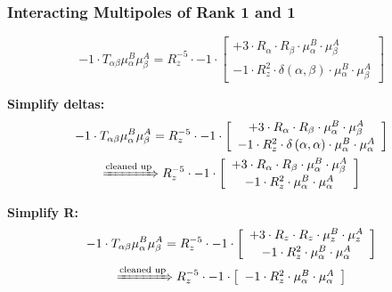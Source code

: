 \documentclass{article}
\begin{document}
\subsubsection*{Interacting Multipoles of Rank 1 and 1}
\begin{equation}
- 1 \cdot T_{\alpha{}\beta{}} \mu{}^{B}_{\alpha{}} \mu{}^{A}_{\beta{}} = R_{z}^{-5} \cdot -1 \cdot  \left[ \begin{array}{c} 
 		+ 3 \cdot R_{\alpha{}} \cdot R_{\beta{}} \cdot \mu{}^{B}_{\alpha{}} \cdot \mu{}^{A}_{\beta{}} 
 \\[0.2em] 		 - 1 \cdot R_{z}^{2} \cdot \delta{}\left(\alpha{}, \beta{}\right) \cdot \mu{}^{B}_{\alpha{}} \cdot \mu{}^{A}_{\beta{}}
 \end{array}\right] 
\end{equation}


\textbf{Simplify deltas:}
\begin{subequations}\begin{gather}
- 1 \cdot T_{\alpha{}\beta{}} \mu{}^{B}_{\alpha{}} \mu{}^{A}_{\beta{}} = R_{z}^{-5} \cdot -1 \cdot  \left[ \begin{array}{c} 
 		+ 3 \cdot R_{\alpha{}} \cdot R_{\beta{}} \cdot \mu{}^{B}_{\alpha{}} \cdot \mu{}^{A}_{\beta{}} 
 \\[0.2em] 		 - 1 \cdot R_{z}^{2} \cdot \delta{}\left(\alpha{}, \alpha{}\right) \cdot \mu{}^{B}_{\alpha{}} \cdot \mu{}^{A}_{\alpha{}}
 \end{array}\right] 
\\ \xRightarrow{\text{cleaned up}}
 R_{z}^{-5} \cdot -1 \cdot  \left[ \begin{array}{c} 
 		+ 3 \cdot R_{\alpha{}} \cdot R_{\beta{}} \cdot \mu{}^{B}_{\alpha{}} \cdot \mu{}^{A}_{\beta{}} 
 \\[0.2em] 		 - 1 \cdot R_{z}^{2} \cdot \mu{}^{B}_{\alpha{}} \cdot \mu{}^{A}_{\alpha{}}
 \end{array}\right] 
\end{gather}\end{subequations}


\textbf{Simplify R:}
\begin{subequations}\begin{gather}
- 1 \cdot T_{\alpha{}\beta{}} \mu{}^{B}_{\alpha{}} \mu{}^{A}_{\beta{}} = R_{z}^{-5} \cdot -1 \cdot  \left[ \begin{array}{c} 
 		+ 3 \cdot R_{z} \cdot R_{z} \cdot \mu{}^{B}_{z} \cdot \mu{}^{A}_{z} 
 \\[0.2em] 		 - 1 \cdot R_{z}^{2} \cdot \mu{}^{B}_{\alpha{}} \cdot \mu{}^{A}_{\alpha{}}
 \end{array}\right] 
\\ \xRightarrow{\text{cleaned up}}
 R_{z}^{-5} \cdot -1 \cdot  \left[ \begin{array}{c} 
 		- 1 \cdot R_{z}^{2} \cdot \mu{}^{B}_{\alpha{}} \cdot \mu{}^{A}_{\alpha{}}
 \end{array}\right] 
\end{gather}\end{subequations}
\end{document}
